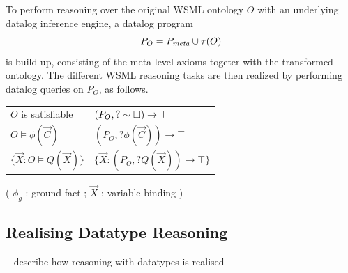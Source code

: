 To perform reasoning over the original WSML ontology $O$ with an
underlying datalog inference engine, a datalog program
\begin{displaymath}
    P_O = \mlaxioms \cup \tau(O)
\end{displaymath}
is build up, consisting of the meta-level axioms togeter with the
transformed ontology. The different WSML reasoning tasks are then
realized by performing datalog queries on $P_O$, as follows.
\begin{small}
\begin{tabular}{|l|l|}
  \hline
  $O$ is satisfiable & $(P_O, ?\sim \square) \rightarrow \top$ \\
  $O \models \phi(\vec{C})$ & $(P_O, ?\phi(\vec{C})) \rightarrow \top$ \\
  $\{\vec{X} : O \models Q(\vec{X})\}$ & $\{\vec{X} : (P_O, ?Q(\vec{X})) \rightarrow \top\}$ \\
 \hline
\end{tabular}
\end{small}

( $\phi_g$ : ground fact ; $\vec{X}$ : variable binding )


\subsection{Realising Datatype Reasoning}
-- describe how reasoning with datatypes is realised
